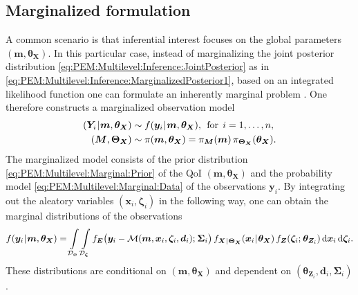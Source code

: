 \subsection{Marginalized formulation} \label{sec:PEM:Multilevel:MarginalizedFormulation}
A common scenario is that inferential interest focuses on the global parameters \((\bm{m},\bm{\theta}_{\bm{X}})\).
In this particular case, instead of marginalizing the joint posterior distribution \cref{eq:PEM:Multilevel:Inference:JointPosterior} as in \cref{eq:PEM:Multilevel:Inference:MarginalizedPosterior1},
based on an integrated likelihood function one can formulate an inherently marginal problem \cite{Statistics:Berger1999,Statistics:Severini1999,Statistics:Severini2007}.
One therefore constructs a marginalized observation model
\begin{subequations} \label{eq:PEM:Multilevel:Marginal:Model}
  \begin{align}
    (\bm{Y}_i {\:\!}|{\:\!} \bm{m},\bm{\theta}_{\bm{X}}) &\sim f(\bm{y}_i {\:\!}|{\:\!} \bm{m},\bm{\theta}_{\bm{X}}), \;\, \text{for} \;\, i=1,\ldots,n, \label{eq:PEM:Multilevel:Marginal:Data}\\
    (\bm{M},\bm{\Theta}_{\bm{X}}) &\sim \pi(\bm{m},\bm{\theta}_{\bm{X}}) = \pi_{\bm{M}} (\bm{m}) \, \pi_{\bm{\Theta}_{\bm{X}}}(\bm{\theta}_{\bm{X}}). \label{eq:PEM:Multilevel:Marginal:Prior}
  \end{align}
\end{subequations}
The marginalized model consists of the prior distribution \cref{eq:PEM:Multilevel:Marginal:Prior} of the QoI \((\bm{m},\bm{\theta}_{\bm{X}})\)
and the probability model \cref{eq:PEM:Multilevel:Marginal:Data} of the observations \(\bm{y}_i\).
By integrating out the aleatory variables \((\bm{x}_i,\bm{\zeta}_i)\) in the following way, one can obtain the marginal distributions of the observations
\begin{equation} \label{eq:PEM:Multilevel:Marginal:Marginalization}
  f(\bm{y}_i \cond \bm{m},\bm{\theta}_{\bm{X}}) = \int\limits_{\mathcal{D}_{\bm{x}}} \int\limits_{\mathcal{D}_{\bm{\zeta}}}
  f_{\bm{E}} \big( \bm{y}_i-\mathcal{M}(\bm{m},\bm{x}_i,\bm{\zeta}_i,\bm{d}_i) \distparam \bm{\Sigma}_i \big) \, f_{\bm{X} \cond \bm{\Theta}_{\bm{X}}} (\bm{x}_i \cond \bm{\theta}_{\bm{X}})
  \, f_{\bm{Z}}(\bm{\zeta}_i \distparam \bm{\theta}_{\bm{Z}_i}) \, \mathrm{d} \bm{x}_i \, \mathrm{d} \bm{\zeta}_i.
\end{equation}
These distributions are conditional on \((\bm{m},\bm{\theta}_{\bm{X}})\) and dependent on \((\bm{\theta}_{\bm{Z}_i},\bm{d}_i,\bm{\Sigma}_i)\).
